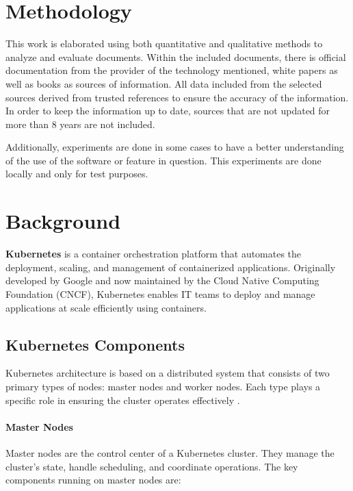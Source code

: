 \documentclass[a4paper,11pt,openright,BCOR=15mm]{scrbook}
\begin{document}
	\chapter{Methodology}
	
This work is elaborated using both quantitative and qualitative methods to analyze and evaluate documents. Within the included documents, there is official documentation from the provider of the technology mentioned, white papers as well as books as sources of information. All data included from the selected sources derived from trusted references to ensure the accuracy of the information. In order to keep the information up to date, sources that are not updated for more than 8 years are not included.

Additionally, experiments are done in some cases to have a better understanding of the use of the software or feature in question. This experiments are done locally and only for test purposes.


\chapter{Background}

\textbf{Kubernetes} is a container orchestration platform that automates the deployment, scaling, and management of containerized applications. Originally developed by Google and now maintained by the Cloud Native Computing Foundation (CNCF), Kubernetes enables IT teams to deploy and manage applications at scale efficiently using containers.


\section{Kubernetes Components}

Kubernetes architecture is based on a distributed system that consists of two primary types of nodes: master nodes and worker nodes. Each type plays a specific role in ensuring the cluster operates effectively \cite{the_linux_foundation_kubernetes_2024}.

\subsubsection{Master Nodes}\label{sect:masters}
Master nodes are the control center of a Kubernetes cluster. They manage the cluster’s state, handle scheduling, and coordinate operations. The key components running on master nodes are:
\end{document}
